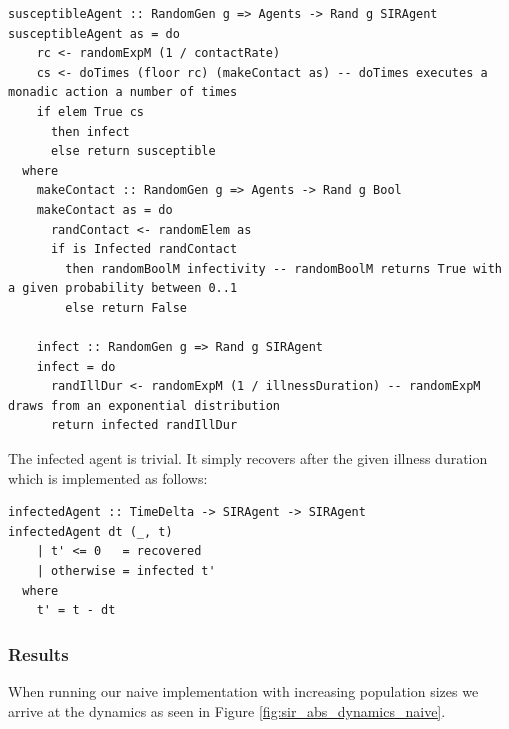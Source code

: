 \begin{verbatim}
susceptibleAgent :: RandomGen g => Agents -> Rand g SIRAgent
susceptibleAgent as = do
    rc <- randomExpM (1 / contactRate)
    cs <- doTimes (floor rc) (makeContact as) -- doTimes executes a monadic action a number of times
    if elem True cs
      then infect
      else return susceptible
  where
    makeContact :: RandomGen g => Agents -> Rand g Bool
    makeContact as = do
      randContact <- randomElem as
      if is Infected randContact
        then randomBoolM infectivity -- randomBoolM returns True with a given probability between 0..1
        else return False

    infect :: RandomGen g => Rand g SIRAgent
    infect = do
      randIllDur <- randomExpM (1 / illnessDuration) -- randomExpM draws from an exponential distribution
      return infected randIllDur
\end{verbatim}

The infected agent is trivial. It simply recovers after the given illness duration which is implemented as follows:

\begin{verbatim}
infectedAgent :: TimeDelta -> SIRAgent -> SIRAgent
infectedAgent dt (_, t) 
    | t' <= 0   = recovered
    | otherwise = infected t'
  where
    t' = t - dt  
\end{verbatim}

\subsubsection{Results}
When running our naive implementation with increasing population sizes we arrive at the dynamics as seen in Figure \ref{fig:sir_abs_dynamics_naive}.

